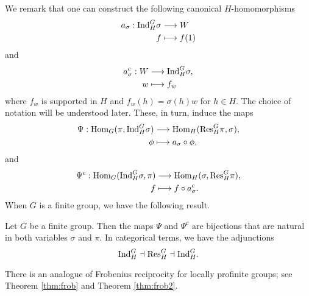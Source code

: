 We remark that one can construct the following canonical $H$-homomorphisms 
\begin{align*}
    a_\sigma: \mathrm{Ind}_H^G\sigma&\longrightarrow W\\
    f&\longmapsto f(1)
\end{align*}
and 
\begin{align*}
    a_\sigma^c: W&\longrightarrow \mathrm{Ind}_H^G\sigma,\\
    w&\longmapsto f_w
\end{align*}
where $f_w$ is supported in $H$ and $f_w(h)=\sigma(h)w$ for $h\in H$. The choice of notation will be understood later. These, in turn, induce the maps 
\begin{align*}
    \Psi:\mathrm{Hom}_G(\pi,\mathrm{Ind}_H^G\sigma)&\longrightarrow\mathrm{Hom}_H(\mathrm{Res}_H^G\pi,\sigma),\\
    \phi&\longmapsto a_\sigma\circ\phi,
\end{align*}
and
\begin{align*}
    \Psi^c:\mathrm{Hom}_G(\mathrm{Ind}_H^G\sigma,\pi)&\longrightarrow\mathrm{Hom}_H(\sigma,\mathrm{Res}_H^G\pi),\\
    f&\longmapsto f\circ a_\sigma^c.
\end{align*}
When $G$ is a finite group, we have the following result.
\begin{thm}
    Let $G$ be a finite group. Then the maps $\Psi$ and $\Psi^c$ are bijections that are natural in both variables $\sigma$ and $\pi$. In categorical terms, we have the adjunctions $$\mathrm{Ind}_H^G\dashv\mathrm{Res}_H^G\dashv\mathrm{Ind}_H^G.$$
\end{thm}

There is an analogue of Frobenius reciprocity for locally profinite groups; see Theorem \ref{thm:frob} and Theorem \ref{thm:frob2}.